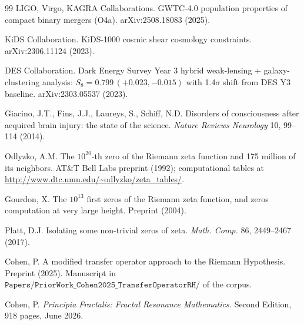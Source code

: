 \documentclass[11pt,a4paper]{amsart}
\theoremstyle{plain}
\theoremstyle{definition}
\begin{document}
\begin{thebibliography}{99}
LIGO, Virgo, KAGRA Collaborations.
\newblock GWTC-4.0 population properties of compact binary mergers (O4a).
\newblock arXiv:2508.18083 (2025).

KiDS Collaboration.
\newblock KiDS-1000 cosmic shear cosmology constraints.
\newblock arXiv:2306.11124 (2023).

DES Collaboration.
\newblock Dark Energy Survey Year 3 hybrid weak-lensing $+$ galaxy-clustering analysis: $S_{8} = 0.799 \, (+0.023, -0.015)$ with 1.4$\sigma$ shift from DES Y3 baseline.
\newblock arXiv:2303.05537 (2023).

Giacino, J.T., Fins, J.J., Laureys, S., Schiff, N.D.
\newblock Disorders of consciousness after acquired brain injury: the state of the science.
\newblock \emph{Nature Reviews Neurology} 10, 99--114 (2014).

Odlyzko, A.M.
\newblock The $10^{20}$-th zero of the Riemann zeta function and 175 million of its neighbors.
\newblock AT\&T Bell Labs preprint (1992); computational tables at \url{http://www.dtc.umn.edu/~odlyzko/zeta_tables/}.

Gourdon, X.
\newblock The $10^{13}$ first zeros of the Riemann zeta function, and zeros computation at very large height.
\newblock Preprint (2004).

Platt, D.J.
\newblock Isolating some non-trivial zeros of zeta.
\newblock \emph{Math. Comp.} 86, 2449--2467 (2017).

Cohen, P.
\newblock A modified transfer operator approach to the Riemann Hypothesis.
\newblock Preprint (2025). Manuscript in $\texttt{Papers/PriorWork\_Cohen2025\_TransferOperatorRH/}$ of the corpus.

Cohen, P.
\newblock \emph{Principia Fractalis: Fractal Resonance Mathematics.}
\newblock Second Edition, 918 pages, June 2026.

\end{thebibliography}
\end{document}
